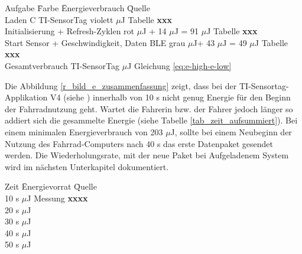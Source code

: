 \begin{minipage}{\textwidth}
\label{everbrauch_aufgaben}
    \begin{tabbing}
    Aufgabe \hspace{6 cm} \quad\=  Farbe \quad\= Energieverbrauch \hspace{1cm} \quad\= Quelle \\[0.8ex]
    Laden C TI-SensorTag  \> violett       $\mu$J    \> Tabelle \textbf{xxx}\\
    Initialisierung + Refresh-Zyklen \> rot  $\mu$J + 14 $\mu$J = 91 $\mu$J \> Tabelle \textbf{xxx}\\
    Start Sensor + Geschwindigkeit, Daten BLE\> grau  $\mu$J+ 43 $\mu$J = 49 $\mu$J    \> Tabelle \textbf{xxx}\\
    Gesamtverbrauch TI-SensorTag     \>      $\mu$J    \> Gleichung \ref{eq:e-high-e-low}\\
    \end{tabbing}
\end{minipage}


Die Abbildung \ref{r_bild_e_zusammenfassung} zeigt, dass bei der TI-Sensortag-Applikation V4 (siehe ) innerhalb von 10 s nicht genug Energie für den Beginn der Fahrradnutzung geht. Wartet die Fahrerin bzw. der Fahrer jedoch länger so addiert sich die gesammelte Energie (siehe Tabelle \ref{tab_zeit_aufsummiert}). Bei einem minimalen Energieverbrauch von 203 $\mu$J, sollte bei einem Neubeginn der Nutzung des Fahrrad-Computers nach 40 s das erste Datenpaket gesendet werden. Die Wiederholungsrate, mit der neue Paket bei Aufgeladenem System wird im nächsten Unterkapitel dokumentiert.

\begin{minipage}{\textwidth}
\label{tab_zeit_aufsummiert}
    \begin{tabbing}
    Zeit  \quad\=  Energievorrat \quad\= Quelle\\[0.8ex]
    10 s   $\mu$J   \>  Messung \textbf{xxxx} \\
    20 s   $\mu$J  \> \\
    30 s   $\mu$J  \> \\
    40 s   $\mu$J  \> \\
    50 s   $\mu$J  \> \\
    \end{tabbing}
\end{minipage}

